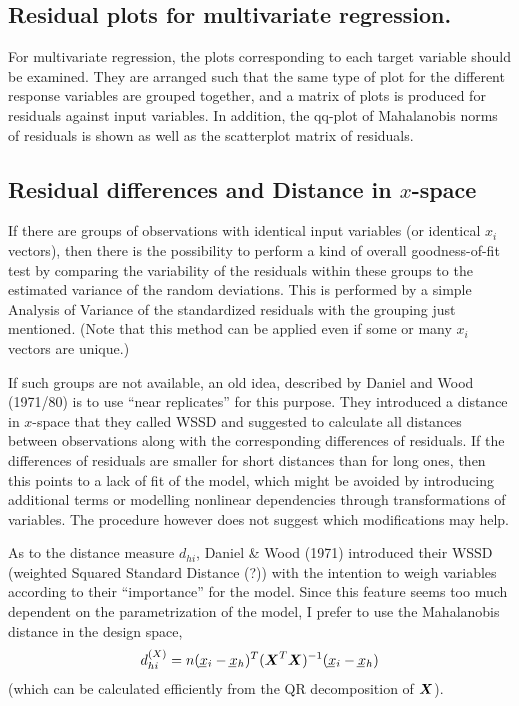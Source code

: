 \documentclass[11pt]{article}\usepackage[]{graphicx}\usepackage[]{color}
\begin{document}

\subsection{Residual plots for multivariate regression.}
For multivariate regression, the plots corresponding to each target
variable should be examined. 
They are arranged such that the same type of plot for the different
response variables are grouped together, and a matrix of plots is produced
for residuals against input variables.
In addition, the qq-plot of Mahalanobis norms of residuals is shown as well
as the scatterplot matrix of residuals.


\subsection{Residual differences and Distance in $x$-space}
If there are groups of observations with identical input variables
(or identical $x_i$ vectors), then there is the possibility to perform a kind
of overall goodness-of-fit test by comparing the variability of the
residuals within these groups to the estimated variance of the 
random deviations.
This is performed by a simple Analysis of Variance of the standardized 
residuals with the grouping just mentioned. 
(Note that this method can be applied even if some or many $x_i$ vectors 
are unique.)

If such groups are not available, an old idea, described by
Daniel and Wood (1971/80) is to use ``near replicates'' for this purpose. 
They introduced a distance in $x$-space that they called WSSD and suggested
to calculate all distances between observations along with the
corresponding differences of residuals. If the differences of residuals
are smaller for short distances than for long ones, then this points to a
lack of fit of the model, which might be avoided by introducing 
additional terms or modelling nonlinear dependencies through
transformations of variables. The procedure however does not suggest
which modifications may help.

As to the distance measure $d_{hi}$, %
Daniel \& Wood (1971) introduced their 
WSSD (weighted Squared Standard Distance (?))
with the intention to weigh variables according to their ``importance'' for
the model. Since this feature seems too much dependent on the
parametrization of the model, I prefer to use the Mahalanobis distance in
the design space, 
$$
  d\sups X_{hi} = n(\vc x_i-\vc x_h)^T (\mx X^T\mx X)^{-1} (\vc x_i-\vc x_h)
$$
(which can be calculated efficiently from the QR decomposition of $\mx X$).
\end{document}
